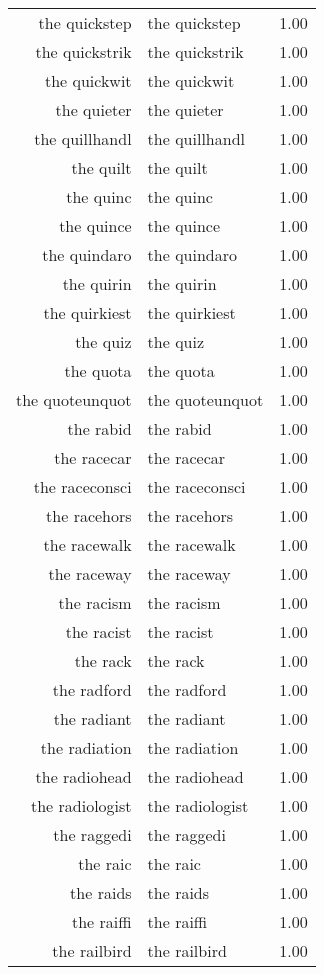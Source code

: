 \begin{table}[ht]
\begin{tabular}{rlr}
  the quickstep & the quickstep & 1.00 \\ 
  the quickstrik & the quickstrik & 1.00 \\ 
  the quickwit & the quickwit & 1.00 \\ 
  the quieter & the quieter & 1.00 \\ 
  the quillhandl & the quillhandl & 1.00 \\ 
  the quilt & the quilt & 1.00 \\ 
  the quinc & the quinc & 1.00 \\ 
  the quince & the quince & 1.00 \\ 
  the quindaro & the quindaro & 1.00 \\ 
  the quirin & the quirin & 1.00 \\ 
  the quirkiest & the quirkiest & 1.00 \\ 
  the quiz & the quiz & 1.00 \\ 
  the quota & the quota & 1.00 \\ 
  the quoteunquot & the quoteunquot & 1.00 \\ 
  the rabid & the rabid & 1.00 \\ 
  the racecar & the racecar & 1.00 \\ 
  the raceconsci & the raceconsci & 1.00 \\ 
  the racehors & the racehors & 1.00 \\ 
  the racewalk & the racewalk & 1.00 \\ 
  the raceway & the raceway & 1.00 \\ 
  the racism & the racism & 1.00 \\ 
  the racist & the racist & 1.00 \\ 
  the rack & the rack & 1.00 \\ 
  the radford & the radford & 1.00 \\ 
  the radiant & the radiant & 1.00 \\ 
  the radiation & the radiation & 1.00 \\ 
  the radiohead & the radiohead & 1.00 \\ 
  the radiologist & the radiologist & 1.00 \\ 
  the raggedi & the raggedi & 1.00 \\ 
  the raic & the raic & 1.00 \\ 
  the raids & the raids & 1.00 \\ 
  the raiffi & the raiffi & 1.00 \\ 
  the railbird & the railbird & 1.00 \\ 

\end{tabular}
\end{table}
